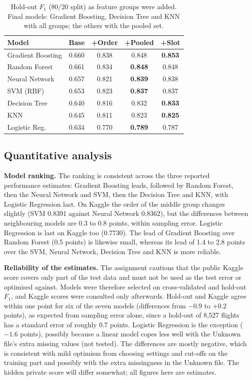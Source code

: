 \documentclass[12pt,a4paper]{article}
\newcommand{\Fone}{$F_1$}
\begin{document}
\begin{table}[t]
\caption{Hold-out \Fone{} (80/20 split) as feature groups were added. Final models: Gradient Boosting, Decision Tree and KNN with all groups; the others with the pooled set.}\label{tab:ladder}
\small\centering\setlength{\tabcolsep}{3.5pt}
\begin{tabular}{@{}l cccc@{}}
\toprule
Model & Base & +Order & +Pooled & +Slot\\
\midrule
Gradient Boosting & 0.660 & 0.838 & 0.848 & \textbf{0.853}\\
Random Forest & 0.661 & 0.834 & \textbf{0.848} & 0.848\\
Neural Network & 0.657 & 0.821 & \textbf{0.839} & 0.838\\
SVM (RBF) & 0.653 & 0.823 & \textbf{0.837} & 0.837\\
Decision Tree & 0.640 & 0.816 & 0.832 & \textbf{0.833}\\
KNN & 0.645 & 0.811 & 0.823 & \textbf{0.825}\\
Logistic Reg. & 0.634 & 0.770 & \textbf{0.789} & 0.787\\
\bottomrule
\end{tabular}
\end{table}

\subsection{Quantitative analysis}\label{sec:kaggle}
\textbf{Model ranking.} The ranking is consistent across the three reported performance estimates: Gradient Boosting leads, followed by Random Forest, then the Neural Network and SVM, then the Decision Tree and KNN, with Logistic Regression last. On Kaggle the order of the middle group changes slightly (SVM 0.8391 against Neural Network 0.8362), but the differences between neighbouring models are 0.3 to 0.8 points, within sampling error. Logistic Regression is last on Kaggle too (0.7730). The lead of Gradient Boosting over Random Forest (0.5 points) is likewise small, whereas its lead of 1.4 to 2.8 points over the SVM, Neural Network, Decision Tree and KNN is more reliable.

\textbf{Reliability of the estimates.} The assignment cautions that the public Kaggle score covers only part of the test data and must not be used as the test error or optimised against. Models were therefore selected on cross-validated and hold-out \Fone{}, and Kaggle scores were consulted only afterwards. Hold-out and Kaggle agree within one point for six of the seven models (differences from $-0.9$ to $+0.2$ points), as expected from sampling error alone, since a hold-out of 8,527 flights has a standard error of roughly 0.7 points. Logistic Regression is the exception ($-1.6$ points), possibly because a linear model copes less well with the Unknown file's extra missing values (not tested). The differences are mostly negative, which is consistent with mild optimism from choosing settings and cut-offs on the training part and possibly with the extra missingness in the Unknown file. The hidden private score will differ somewhat; all figures here are estimates.
\end{document}
